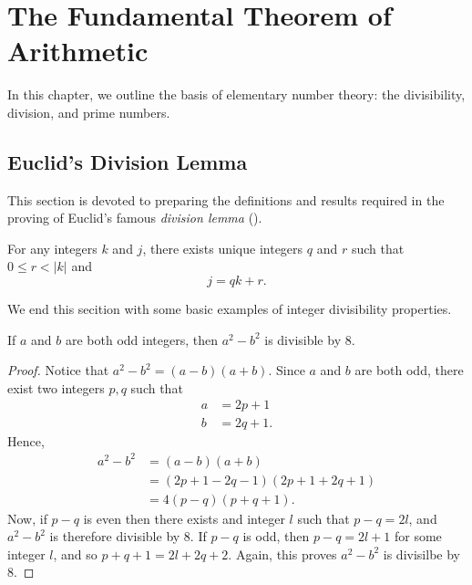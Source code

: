 \chapter{The Fundamental Theorem of Arithmetic}

In this chapter, we outline the basis of elementary number theory: the divisibility, division, and prime numbers.

\section{Euclid's Division Lemma}

This section is devoted to preparing the definitions and results required in the proving of Euclid's famous \textit{division lemma} ().

\begin{theorem}\label{thm:euclid_lemma}
	For any integers $k$ and $j$, there exists unique integers $q$ and $r$ such that $0 \leq r < |k|$ and
	\begin{equation}
		j = qk + r.
	\end{equation}
\end{theorem}


We end this secition with some basic examples of integer divisibility properties.

\begin{proposition}[Exercise 2.1.6]
	If $a$ and $b$ are both odd integers, then $a^2 - b^2$ is divisible by 8.
\end{proposition}
\begin{proof}
	Notice that $a^2 - b^2 = (a - b)(a + b)$. Since $a$ and $b$ are both odd, there exist two integers $p, q$ such that 
	\begin{align*}
		a &= 2p + 1\\
		b &= 2q + 1.
	\end{align*}
	Hence,
	\begin{align*}
		a^2 - b^2 &= (a - b)(a + b)\\
		&= (2p + 1 - 2q - 1)(2p + 1 + 2q + 1)\\
		&= 4(p - q)(p + q + 1).
	\end{align*}
	Now, if $p - q$ is even then there exists and integer $l$ such that $p - q = 2l$, and $a^2 - b^2$ is therefore divisible by $8$. If $p - q$ is odd, then $p - q = 2l + 1$ for some integer $l$, and so $p + q + 1 = 2l + 2q + 2$. Again, this proves $a^2 - b^2$ is divisilbe by $8$.
\end{proof}

